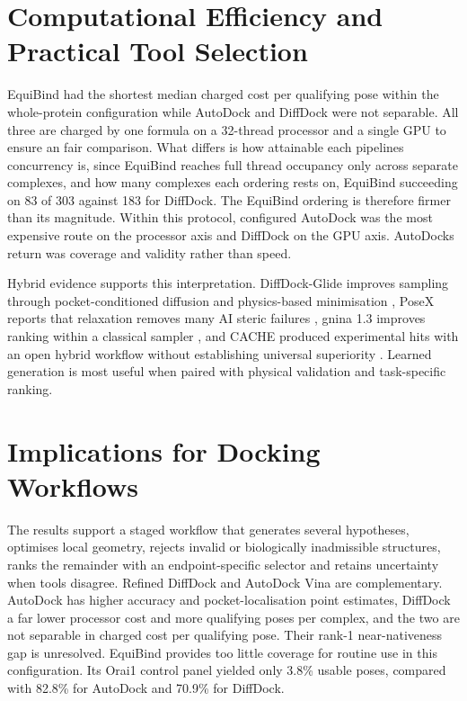 \hypertarget{computational-efficiency-and-practical-tool-selection}{%
\section{Computational Efficiency and Practical Tool Selection}\label{computational-efficiency-and-practical-tool-selection}}

EquiBind had the shortest median charged cost per qualifying pose within the whole-protein configuration while AutoDock and DiffDock were not separable. All three are charged by one formula on a 32-thread processor and a single GPU to ensure an fair comparison. What differs is how attainable each pipeline\textquotesingle{}s concurrency is, since EquiBind reaches full thread occupancy only across separate complexes, and how many complexes each ordering rests on, EquiBind succeeding on 83 of 303 against 183 for DiffDock. The EquiBind ordering is therefore firmer than its magnitude. Within this protocol, configured AutoDock was the most expensive route on the processor axis and DiffDock on the GPU axis. AutoDock\textquotesingle{}s return was coverage and validity rather than speed.

Hybrid evidence supports this interpretation. DiffDock-Glide improves sampling through pocket-conditioned diffusion and physics-based minimisation \cite{ref064}, PoseX reports that relaxation removes many AI steric failures \cite{ref012}, gnina 1.3 improves ranking within a classical sampler \cite{ref067}, and CACHE produced experimental hits with an open hybrid workflow without establishing universal superiority \cite{ref068}. Learned generation is most useful when paired with physical validation and task-specific ranking.

\hypertarget{implications-for-docking-workflows}{%
\section{Implications for Docking Workflows}\label{implications-for-docking-workflows}}

The results support a staged workflow that generates several hypotheses, optimises local geometry, rejects invalid or biologically inadmissible structures, ranks the remainder with an endpoint-specific selector and retains uncertainty when tools disagree. Refined DiffDock and AutoDock Vina are complementary. AutoDock has higher accuracy and pocket-localisation point estimates, DiffDock a far lower processor cost and more qualifying poses per complex, and the two are not separable in charged cost per qualifying pose. Their rank-1 near-nativeness gap is unresolved. EquiBind provides too little coverage for routine use in this configuration. Its Orai1 control panel yielded only 3.8\% usable poses, compared with 82.8\% for AutoDock and 70.9\% for DiffDock.

